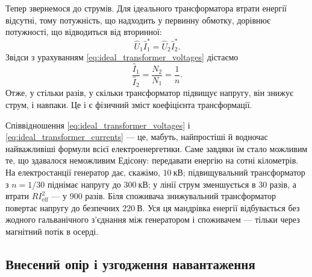 Тепер звернемося до струмів. Для ідеального трансформатора
втрати енергії відсутні, тому потужність, що надходить у
первинну обмотку, дорівнює потужності, що відводиться від
вторинної:
\begin{equation}\label{eq:ideal_transformer_power}
	\hat{U}_1 \hat{I}_1^* = \hat{U}_2 \hat{I}_2^*.
\end{equation}
Звідси з урахуванням \eqref{eq:ideal_transformer_voltages}
дістаємо
\begin{equation}\label{eq:ideal_transformer_currents}
	\frac{\hat{I}_1}{\hat{I}_2} = \frac{N_2}{N_1} = \frac{1}{n}.
\end{equation}
Отже, у стільки разів, у скільки трансформатор підвищує
напругу, він знижує струм, і навпаки. Це і є фізичний зміст
коефіцієнта трансформації.

\begin{Attention}
	Співвідношення \eqref{eq:ideal_transformer_voltages} і
	\eqref{eq:ideal_transformer_currents} --- це, мабуть,
	найпростіші й водночас найважливіші формули всієї
	електроенергетики. Саме завдяки їм стало можливим те, що
	здавалося неможливим Едісону: передавати енергію на сотні
	кілометрів. На електростанції генератор дає, скажімо,
	$10\ \text{кВ}$; підвищувальний трансформатор з $n=1/30$
	піднімає напругу до $300\ \text{кВ}$; у лінії струм
	зменшується в $30$ разів, а втрати $RI_{\text{eff}}^2$ ---
	у $900$ разів. Біля споживача знижувальний трансформатор
	повертає напругу до безпечних $220\ \text{В}$. Уся ця
	мандрівка енергії відбувається без жодного гальванічного
	з'єднання між генератором і споживачем --- тільки через
	магнітний потік в осерді.
\end{Attention}

\subsection*{Внесений опір і узгодження навантаження}

